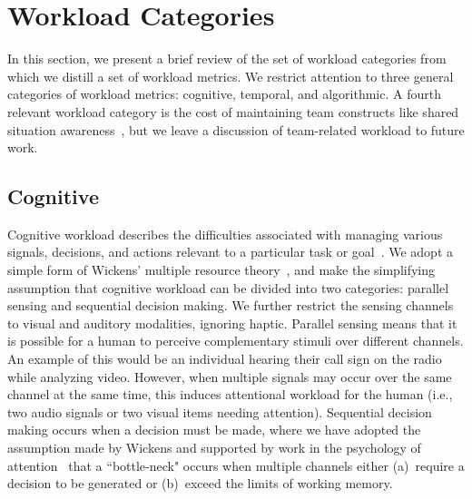 \section{Workload Categories}

In this section, we present a brief review of the set of workload categories from which we distill a set of workload metrics.  We restrict attention to three general categories of workload metrics: cognitive, temporal, and algorithmic.  A fourth relevant workload category is the cost of maintaining team constructs like shared situation awareness~\cite{EliasFiore2011}, but we leave a discussion of team-related workload to future work.



\subsection{Cognitive}
Cognitive workload describes the difficulties associated with managing various signals, decisions, and actions relevant to a particular task or goal~\cite{MorayEtAl91,lebiere2013cognitive,Goodrich2004,Chadwick2004}. We adopt a simple form of Wickens' multiple resource theory~\cite{wickens2002multiple}, and make the simplifying assumption that cognitive workload can be divided into two categories: parallel sensing and sequential decision making. We further restrict the sensing channels to visual and auditory modalities, ignoring haptic.  Parallel sensing means that it is possible for a human to perceive complementary stimuli over different channels. An example of this would be an individual hearing their call sign on the radio while analyzing video. However, when multiple signals may occur over the same channel at the same time, this induces attentional workload for the human (i.e., two audio signals or two visual items needing attention). Sequential decision making occurs when a decision must be made, where we have adopted the assumption made by Wickens and supported by work in the psychology of attention~\cite{Pashler98} that a ``bottle-neck" occurs when multiple channels either (a)~require a decision to be generated or (b)~exceed the limits of working memory. 

